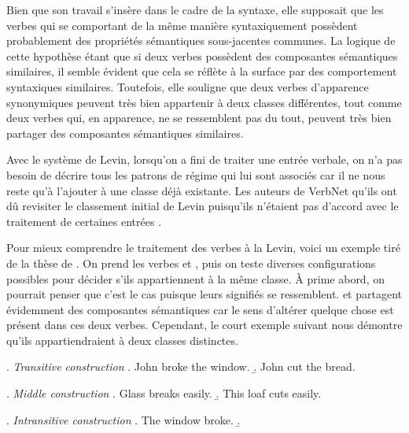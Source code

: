 Bien que son travail s'insère dans le cadre de la syntaxe, elle supposait que les verbes qui se comportant de la même manière syntaxiquement possèdent probablement des propriétés sémantiques sous-jacentes communes. La logique de cette hypothèse étant que si deux verbes possèdent des composantes sémantiques similaires, il semble évident que cela se réflète à la surface par des comportement syntaxiques similaires. Toutefois, elle souligne que deux verbes d'apparence synonymiques peuvent très bien appartenir à deux classes différentes, tout comme deux verbes qui, en apparence, ne se ressemblent pas du tout, peuvent très bien partager des composantes sémantiques similaires.

 Avec le système de Levin, lorsqu'on a fini de traiter une entrée verbale, on n'a pas besoin de décrire tous les patrons de régime qui lui sont associés car il ne nous reste qu'à l'ajouter à une classe déjà existante. Les auteurs de VerbNet qu'ils ont dû revisiter le classement initial de Levin puisqu'ils n'étaient pas d'accord avec le traitement de certaines entrées \citep{SchulerVerbnetBroadcoverageComprehensive2005}. 

Pour mieux comprendre le traitement des verbes à la Levin, voici un exemple tiré de la thèse de \cite{SchulerVerbnetBroadcoverageComprehensive2005} . On prend les verbes  et , puis on teste diverses configurations possibles pour décider s'ils appartiennent à la même classe. À prime abord, on pourrait penser que c'est le cas puisque leurs signifiés se ressemblent.  et  partagent évidemment des composantes sémantiques car le sens d'altérer quelque chose est présent dans ces deux verbes. Cependant, le court exemple suivant nous démontre qu'ils appartiendraient à deux classes distinctes.

\ex. \label{transitive} \emph{Transitive construction}
	\a. John broke the window.
	\b. John cut the bread.
	
\ex. \label{middle} \emph{Middle construction}
	\a. Glass breaks easily.
	\b. This loaf cuts easily.
	
\ex. \label{intransitive} \emph{Intransitive construction}
	\a. The window broke.
	\b. 

